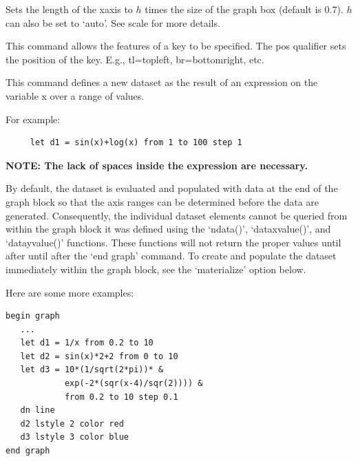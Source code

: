 \begin{commanddescription}
\item[{\sf hscale h} ]
Sets the length of the xaxis to $h$ times the size of the graph box (default is 0.7). $h$ can also be set to `{\sf auto}'. See {\sf scale} for more details.


\item[{\sf key pos {\it tl} nobox hei {\it exp} offset {\it xexp yexp} }  ]
This command allows the features of a key to be specified.
The {\sf pos}
qualifier sets the position of the key.
E.g., {\sf tl}=topleft, {\sf br}=bottomright, etc.

\item[{\sf let ds = {\it exp {\sf [from} low{\sf] [to} high{\sf] [step} exp{\sf] [where} exp{\sf]}}}]

This command defines a new dataset as the result of an expression on the variable x over a range of values.

For example:

\begin{Verbatim}
     let d1 = sin(x)+log(x) from 1 to 100 step 1
\end{Verbatim}

{\bf NOTE: The lack of spaces inside the expression are necessary.}

By default, the dataset is evaluated and populated with data at the end of the graph block so that the axis ranges can be determined before the data are generated. Consequently, the individual dataset elements cannot be queried from within the graph block it was defined using the `ndata()', `dataxvalue()', and `datayvalue()' functions. These functions will not return the proper values until after until after the `end graph' command. To create and populate the dataset immediately within the graph block, see the `materialize' option below.

Here are some more examples:


\begin{minipage}[c]{8cm}
\begin{Verbatim}
begin graph
   ...
   let d1 = 1/x from 0.2 to 10
   let d2 = sin(x)*2+2 from 0 to 10
   let d3 = 10*(1/sqrt(2*pi))* &
            exp(-2*(sqr(x-4)/sqr(2)))) &
            from 0.2 to 10 step 0.1
   dn line
   d2 lstyle 2 color red
   d3 lstyle 3 color blue
end graph
\end{Verbatim}
\end{minipage}
\hfill
\begin{minipage}[c]{7cm}
\mbox{}
\end{minipage}
\vspace{0.2cm}


\end{commanddescription}

